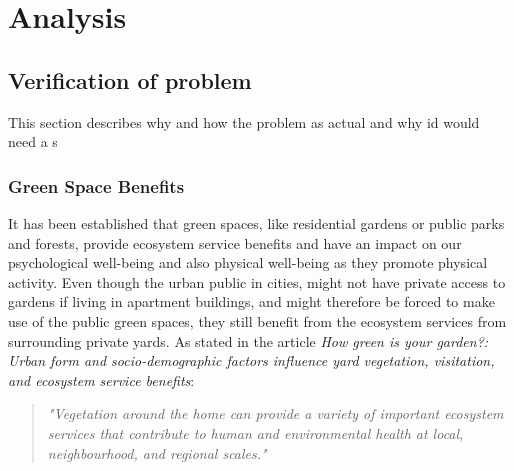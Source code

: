 \chapter{Analysis}
	
		
	\section{Verification of problem}\label{sec:verification}
	This section describes why and how the problem as actual and why id would need a s
		
 	\subsection{Green Space Benefits}
	It has been established that green spaces, like residential gardens or public parks and forests, provide ecosystem service benefits and have an impact on our psychological well-being and also physical well-being as they promote physical activity\cite{urbanGreenSpace}\cite{healthBenefitsNature}. Even though the urban public in cities, might not have private access to gardens if living in apartment buildings, and might therefore be forced to make use of the public green spaces, they still benefit from the ecosystem services from surrounding private yards\cite{greenSpaceBenefits}. As stated in the article \textit{How green is your garden?: Urban form and socio-demographic factors influence yard vegetation, visitation, and ecosystem service benefits}:\\
	
	\begin{quote}
		\textit{"Vegetation around the home can provide a variety of important ecosystem services that contribute to human and environmental health at local, neighbourhood, and regional scales\label{articleQuote}."}
	\end{quote}
	
	
	

